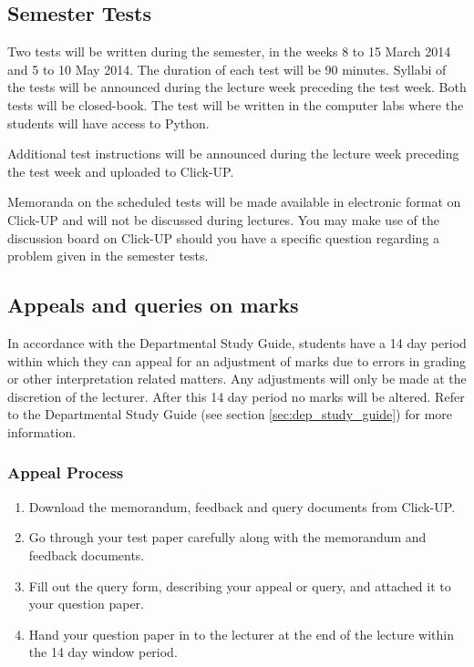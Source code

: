     \subsection{Semester Tests}
        Two tests will be written during the semester, in the weeks 8 to 15
        March 2014 and 5 to 10 May 2014. The duration of each test will be
        90 minutes. Syllabi of the tests will be announced during the lecture
        week preceding the test week. Both tests will be closed-book. The
        test will be written in the computer labs where the students will
        have access to Python.

        Additional test instructions will be announced during the lecture
        week preceding the test week and uploaded to Click-UP.

        Memoranda on the scheduled tests will be made available in electronic
        format on Click-UP and will not be discussed during lectures. You may
        make use of the discussion board on Click-UP should you have a specific
        question regarding a problem given in the semester tests.

    \subsection{Appeals and queries on marks}
        In accordance with the Departmental Study Guide, students have a 14
        day period within which they can appeal for an adjustment of marks
        due to errors in grading or other interpretation related matters.
        Any adjustments will only be made at the discretion of the lecturer.
        After this 14 day period no marks will be altered. Refer to the
        Departmental Study Guide (see section \ref{sec:dep_study_guide})
        for more information.

        \subsubsection{Appeal Process}
            \begin{enumerate}
                \item Download the memorandum, feedback and query documents
                    from Click-UP.
                \item Go through your test paper carefully along with the
                    memorandum and feedback documents.
                \item Fill out the query form, describing your appeal or query,
                    and attached it to your question paper.
                \item Hand your question paper in to the lecturer at the end of
                    the lecture within the 14 day window period.
            \end{enumerate}


